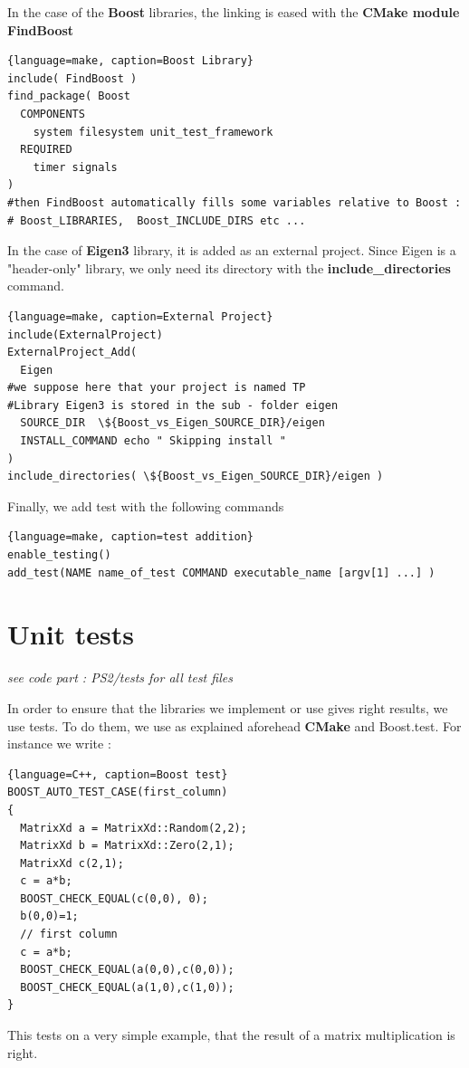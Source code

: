 In the case of the \textbf{Boost} libraries, the linking is eased with the \textbf{CMake module FindBoost} 
\begin{lstlisting}{language=make, caption=Boost Library}
include( FindBoost )
find_package( Boost
  COMPONENTS
    system filesystem unit_test_framework
  REQUIRED
    timer signals
)
#then FindBoost automatically fills some variables relative to Boost :
# Boost_LIBRARIES,  Boost_INCLUDE_DIRS etc ...
\end{lstlisting}

In the case of \textbf{Eigen3} library, it is added as an external project. Since Eigen is a "header-only" library, we only need its directory with the  \textbf{include\_directories} command.
\begin{lstlisting}{language=make, caption=External Project}
include(ExternalProject)
ExternalProject_Add(
  Eigen
#we suppose here that your project is named TP
#Library Eigen3 is stored in the sub - folder eigen
  SOURCE_DIR  \${Boost_vs_Eigen_SOURCE_DIR}/eigen
  INSTALL_COMMAND echo " Skipping install "
)
include_directories( \${Boost_vs_Eigen_SOURCE_DIR}/eigen )
\end{lstlisting}

Finally, we add test with the following commands 
\begin{lstlisting}{language=make, caption=test addition}
enable_testing()
add_test(NAME name_of_test COMMAND executable_name [argv[1] ...] )
\end{lstlisting}

\section{Unit tests}

\emph{see code part : PS2/tests for all test files}

In order to ensure that the libraries we implement or use gives right results, we use tests. 
To do them, we use as explained aforehead \textbf{CMake} and Boost.test.
For instance we write : 
\begin{lstlisting}{language=C++, caption=Boost test}
BOOST_AUTO_TEST_CASE(first_column)
{
  MatrixXd a = MatrixXd::Random(2,2);
  MatrixXd b = MatrixXd::Zero(2,1);
  MatrixXd c(2,1);
  c = a*b;
  BOOST_CHECK_EQUAL(c(0,0), 0);
  b(0,0)=1;
  // first column
  c = a*b;
  BOOST_CHECK_EQUAL(a(0,0),c(0,0));
  BOOST_CHECK_EQUAL(a(1,0),c(1,0));
}
\end{lstlisting}
This tests on a very simple example, that the result of a matrix multiplication is right.


